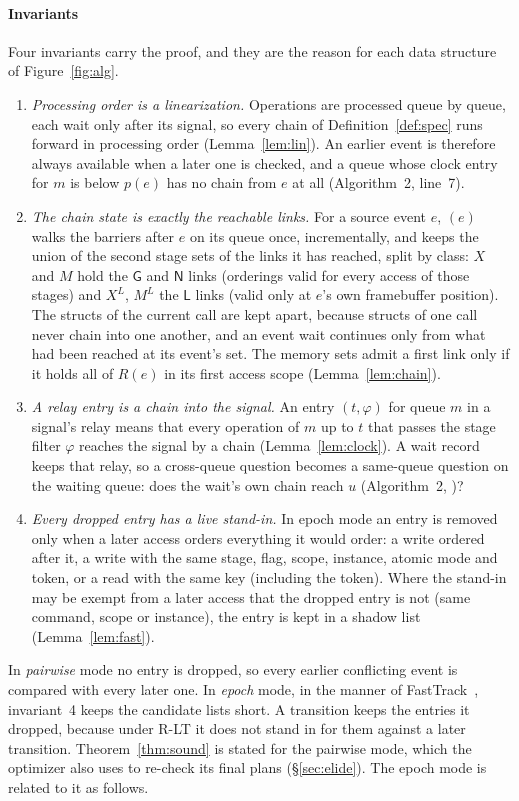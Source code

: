 \paragraph{Invariants}
Four invariants carry the proof, and they are the reason for each data structure of Figure~\ref{fig:alg}.
\begin{enumerate}
\item \emph{Processing order is a linearization.} Operations are processed queue by queue, each wait only after its
  signal, so every chain of Definition~\ref{def:spec} runs forward in processing order (Lemma~\ref{lem:lin}). An
  earlier event is therefore always available when a later one is checked, and a queue whose clock entry for $m$ is
  below $p(e)$ has no chain from $e$ at all (Algorithm~2, line~7).
\item \emph{The chain state is exactly the reachable links.} For a source event $e$, $(e)$ walks the barriers
  after $e$ on its queue once, incrementally, and keeps the union of the second stage sets of the links it has
  reached, split by class: $X$ and $M$ hold the $\mathsf{G}$ and $\mathsf{N}$ links (orderings valid for every access
  of those stages) and $X^L$, $M^L$ the $\mathsf{L}$ links (valid only at $e$'s own framebuffer position). The structs
  of the current call are kept apart, because structs of one call never chain into one another, and an event wait
  continues only from what had been reached at its event's set. The memory sets admit a first link only if it holds
  all of $R(e)$ in its first access scope (Lemma~\ref{lem:chain}).
\item \emph{A relay entry is a chain into the signal.} An entry $(t,\varphi)$ for queue $m$ in a signal's relay
  means that every operation of $m$ up to $t$ that passes the stage filter $\varphi$ reaches the signal by a chain
  (Lemma~\ref{lem:clock}). A wait record keeps that relay, so a cross-queue question becomes a same-queue question on
  the waiting queue: does the wait's own chain reach $u$ (Algorithm~2, )?
\item \emph{Every dropped entry has a live stand-in.} In epoch mode an entry is removed only when a later access
  orders everything it would order: a write ordered after it, a write with the same stage, flag, scope, instance,
  atomic mode and token, or a read with the same key (including the token). Where the stand-in may be exempt from a
  later access that the dropped entry is not (same command, scope or instance), the entry is kept in a shadow list
  (Lemma~\ref{lem:fast}).
\end{enumerate}
In \emph{pairwise} mode no entry is dropped, so every earlier conflicting event is compared with every later one. In
\emph{epoch} mode, in the manner of FastTrack~\cite{flanagan2009fasttrack}, invariant~4 keeps the candidate lists
short. A transition keeps the entries it dropped, because under R-LT it does not stand in for them against a later
transition. Theorem~\ref{thm:sound} is stated for the pairwise mode, which the optimizer also uses to re-check its
final plans (\S\ref{sec:elide}). The epoch mode is related to it as follows.


